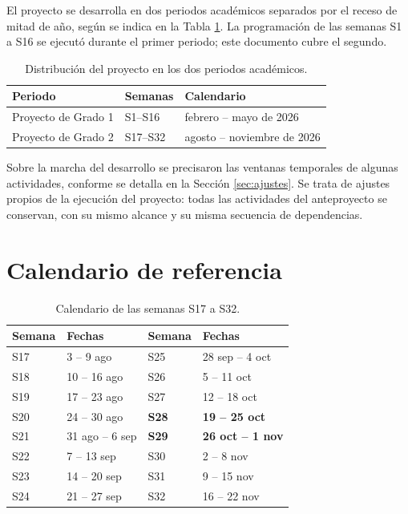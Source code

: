 \documentclass[12pt,letterpaper]{article}
\begin{document}
El proyecto se desarrolla en dos periodos académicos separados por el receso de mitad de año, según se indica en la Tabla \ref{tab:periodos}. La programación de las semanas S1 a S16 se ejecutó durante el primer periodo; este documento cubre el segundo.

\begin{table}[H]
    \centering
    \caption{Distribución del proyecto en los dos periodos académicos.}
    \label{tab:periodos}
    \begin{tabular}{@{}lll@{}}
        \toprule
        \textbf{Periodo} & \textbf{Semanas} & \textbf{Calendario} \\ \midrule
        Proyecto de Grado 1 & S1--S16  & febrero -- mayo de 2026 \\
        Proyecto de Grado 2 & S17--S32 & agosto -- noviembre de 2026 \\ \bottomrule
    \end{tabular}
\end{table}

Sobre la marcha del desarrollo se precisaron las ventanas temporales de algunas actividades, conforme se detalla en la Sección \ref{sec:ajustes}. Se trata de ajustes propios de la ejecución del proyecto: todas las actividades del anteproyecto se conservan, con su mismo alcance y su misma secuencia de dependencias.

\section{Calendario de referencia}

\begin{table}[H]
    \centering
    \caption{Calendario de las semanas S17 a S32.}
    \label{tab:calendario}
    \begin{tabular}{@{}llll@{}}
        \toprule
        \textbf{Semana} & \textbf{Fechas} & \textbf{Semana} & \textbf{Fechas} \\ \midrule
        S17 & 3 -- 9 ago          & S25 & 28 sep -- 4 oct \\
        S18 & 10 -- 16 ago        & S26 & 5 -- 11 oct \\
        S19 & 17 -- 23 ago        & S27 & 12 -- 18 oct \\
        S20 & 24 -- 30 ago        & \textbf{S28} & \textbf{19 -- 25 oct} \\
        S21 & 31 ago -- 6 sep     & \textbf{S29} & \textbf{26 oct -- 1 nov} \\
        S22 & 7 -- 13 sep         & S30 & 2 -- 8 nov \\
        S23 & 14 -- 20 sep        & S31 & 9 -- 15 nov \\
        S24 & 21 -- 27 sep        & S32 & 16 -- 22 nov \\ \bottomrule
    \end{tabular}
\end{table}
\end{document}
